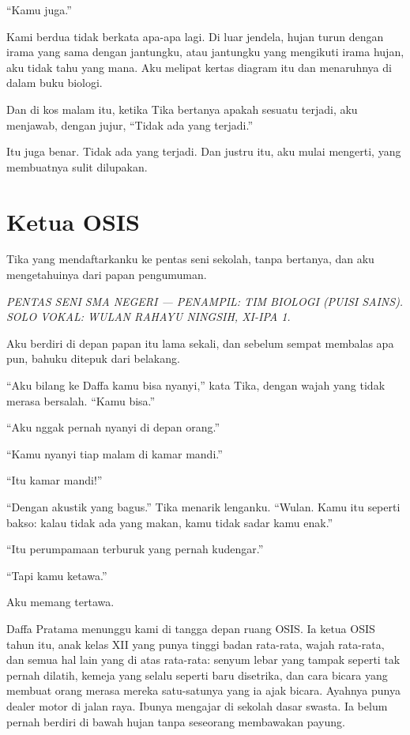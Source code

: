 \documentclass[11pt,twoside,openany]{book}
\begin{document}
``Kamu juga.''

Kami berdua tidak berkata apa-apa lagi. Di luar jendela, hujan turun dengan irama yang sama dengan jantungku, atau jantungku yang mengikuti irama hujan, aku tidak tahu yang mana. Aku melipat kertas diagram itu dan menaruhnya di dalam buku biologi.

Dan di kos malam itu, ketika Tika bertanya apakah sesuatu terjadi, aku menjawab, dengan jujur, ``Tidak ada yang terjadi.''

Itu juga benar. Tidak ada yang terjadi. Dan justru itu, aku mulai mengerti, yang membuatnya sulit dilupakan.

\chapter{Ketua OSIS}
Tika yang mendaftarkanku ke pentas seni sekolah, tanpa bertanya, dan aku mengetahuinya dari papan pengumuman.

\emph{PENTAS SENI SMA NEGERI --- PENAMPIL: TIM BIOLOGI (PUISI SAINS). SOLO VOKAL: WULAN RAHAYU NINGSIH, XI-IPA 1.}

Aku berdiri di depan papan itu lama sekali, dan sebelum sempat membalas apa pun, bahuku ditepuk dari belakang.

``Aku bilang ke Daffa kamu bisa nyanyi,'' kata Tika, dengan wajah yang tidak merasa bersalah. ``Kamu bisa.''

``Aku nggak pernah nyanyi di depan orang.''

``Kamu nyanyi tiap malam di kamar mandi.''

``Itu kamar mandi!''

``Dengan akustik yang bagus.'' Tika menarik lenganku. ``Wulan. Kamu itu seperti bakso: kalau tidak ada yang makan, kamu tidak sadar kamu enak.''

``Itu perumpamaan terburuk yang pernah kudengar.''

``Tapi kamu ketawa.''

Aku memang tertawa.

Daffa Pratama menunggu kami di tangga depan ruang OSIS. Ia ketua OSIS tahun itu, anak kelas XII yang punya tinggi badan rata-rata, wajah rata-rata, dan semua hal lain yang di atas rata-rata: senyum lebar yang tampak seperti tak pernah dilatih, kemeja yang selalu seperti baru disetrika, dan cara bicara yang membuat orang merasa mereka satu-satunya yang ia ajak bicara. Ayahnya punya dealer motor di jalan raya. Ibunya mengajar di sekolah dasar swasta. Ia belum pernah berdiri di bawah hujan tanpa seseorang membawakan payung.
\end{document}
